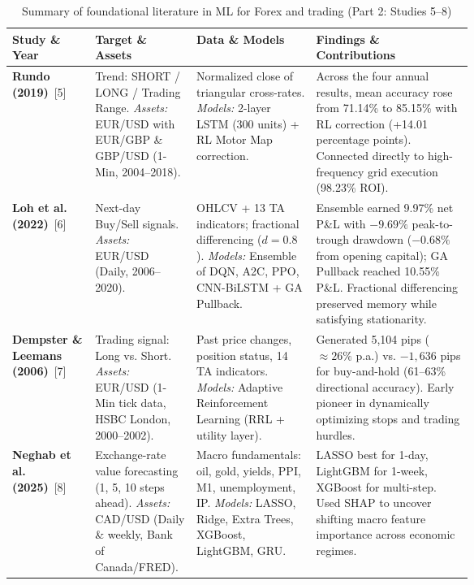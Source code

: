 \documentclass[12pt,a4paper,twoside,openany]{report}
\begin{document}
\begin{table}[htbp]\centering\small\singlespacing
\caption{Summary of foundational literature in ML for Forex and trading (Part 2: Studies 5--8)}\label{tab:lit-review-summary-part2}
\begin{tabularx}{\linewidth}{@{}p{0.18\linewidth}p{0.22\linewidth}p{0.26\linewidth}X@{}}\toprule
\textbf{Study \& Year} & \textbf{Target \& Assets} & \textbf{Data \& Models} & \textbf{Findings \& Contributions}\\\midrule
\textbf{Rundo (2019)}~[5] & 
Trend: SHORT / LONG / Trading Range. \newline 
\textit{Assets:} EUR/USD with EUR/GBP \& GBP/USD (1-Min, 2004--2018). & 
Normalized close of triangular cross-rates. \newline 
\textit{Models:} 2-layer LSTM (300 units) + RL Motor Map correction. & 
Across the four annual results, mean accuracy rose from 71.14\% to 85.15\% with RL correction (+14.01 percentage points). Connected directly to high-frequency grid execution (98.23\% ROI). \\\midrule
\textbf{Loh et al. (2022)}~[6] & 
Next-day Buy/Sell signals. \newline 
\textit{Assets:} EUR/USD (Daily, 2006--2020). & 
OHLCV + 13 TA indicators; fractional differencing ($d=0.8$). \newline 
\textit{Models:} Ensemble of DQN, A2C, PPO, CNN-BiLSTM + GA Pullback. & 
Ensemble earned 9.97\% net P\&L with $-9.69\%$ peak-to-trough drawdown ($-0.68\%$ from opening capital); GA Pullback reached 10.55\% P\&L. Fractional differencing preserved memory while satisfying stationarity. \\\midrule
\textbf{Dempster \& Leemans (2006)}~[7] & 
Trading signal: Long vs. Short. \newline 
\textit{Assets:} EUR/USD (1-Min tick data, HSBC London, 2000--2002). & 
Past price changes, position status, 14 TA indicators. \newline 
\textit{Models:} Adaptive Reinforcement Learning (RRL + utility layer). & 
Generated 5,104 pips ($\approx 26\%$ p.a.) vs. $-1,636$ pips for buy-and-hold (61--63\% directional accuracy). Early pioneer in dynamically optimizing stops and trading hurdles. \\\midrule
\textbf{Neghab et al. (2025)}~[8] & 
Exchange-rate value forecasting (1, 5, 10 steps ahead). \newline 
\textit{Assets:} CAD/USD (Daily \& weekly, Bank of Canada/FRED). & 
Macro fundamentals: oil, gold, yields, PPI, M1, unemployment, IP. \newline 
\textit{Models:} LASSO, Ridge, Extra Trees, XGBoost, LightGBM, GRU. & 
LASSO best for 1-day, LightGBM for 1-week, XGBoost for multi-step. Used SHAP to uncover shifting macro feature importance across economic regimes. \\
\bottomrule\end{tabularx}
\end{table}
\end{document}
